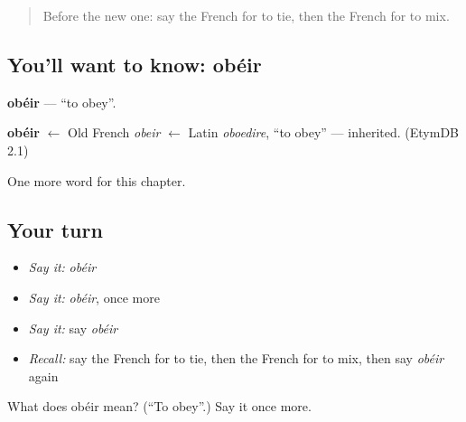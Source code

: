 \begin{quote}
Before the new one: say the French for to tie, then the French for to mix.
\end{quote}

\subsection*{You'll want to know: obéir}
\textbf{obéir} — \textquotedblleft{}to obey\textquotedblright{}.

\begin{cousinweb}
\textbf{obéir} $\leftarrow$ Old French \emph{obeir} $\leftarrow$ Latin \emph{oboedire}, \textquotedblleft{}to obey\textquotedblright{} — inherited. (EtymDB 2.1)
\end{cousinweb}

\begin{grammarlens}[title={What you've built}]
One more word for this chapter.
\end{grammarlens}

\subsection*{Your turn}
\begin{itemize}
\raggedright
  \item \emph{Say it:} \emph{obéir}
  \item \emph{Say it:} \emph{obéir}, once more
  \item \emph{Say it:} say \emph{obéir}
  \item \emph{Recall:} say the French for to tie, then the French for to mix, then say \emph{obéir} again
\end{itemize}

\begin{tcolorbox}[breakable,colback=teal!4,colframe=teal!35!black,title={Before you move on}]
What does obéir mean? (\textquotedblleft{}To obey\textquotedblright{}.) Say it once more.
\end{tcolorbox}
